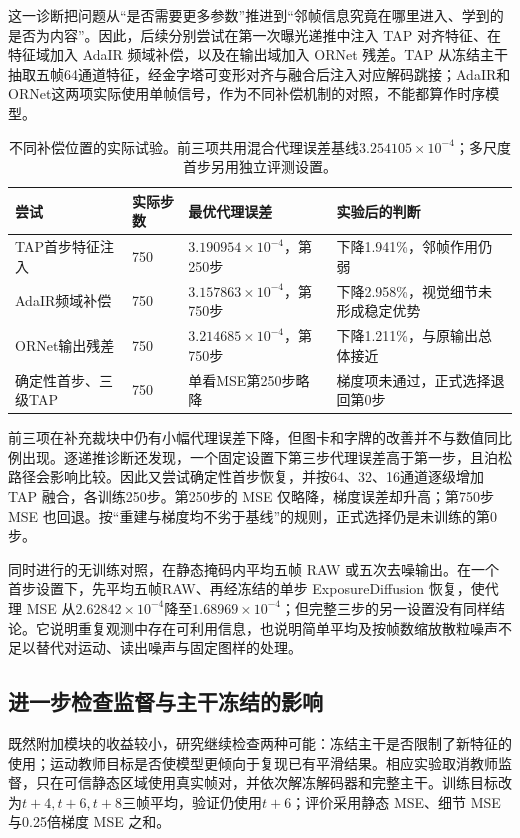 \documentclass[11pt,a4paper,UTF8,fontset=fandol]{ctexart}
\begin{document}
这一诊断把问题从“是否需要更多参数”推进到“邻帧信息究竟在哪里进入、学到的是否为内容”。因此，后续分别尝试在第一次曝光递推中注入 TAP 对齐特征、在特征域加入 AdaIR 频域补偿，以及在输出域加入 ORNet 残差。TAP 从冻结主干抽取五帧64通道特征，经金字塔可变形对齐与融合后注入对应解码跳接；AdaIR和ORNet这两项实际使用单帧信号，作为不同补偿机制的对照，不能都算作时序模型。

\begin{table}[!htbp]
\centering\small
\caption{不同补偿位置的实际试验。前三项共用混合代理误差基线$3.254105\times10^{-4}$；多尺度首步另用独立评测设置。}
\label{tab:djc_pilots}
\begin{tabular}{P{0.21\textwidth}P{0.12\textwidth}P{0.22\textwidth}P{0.33\textwidth}}
\toprule
尝试 & 实际步数 & 最优代理误差 & 实验后的判断 \\
\midrule
TAP首步特征注入 & 750 & $3.190954\times10^{-4}$，第250步 & 下降1.941\%，邻帧作用仍弱 \\
AdaIR频域补偿 & 750 & $3.157863\times10^{-4}$，第750步 & 下降2.958\%，视觉细节未形成稳定优势 \\
ORNet输出残差 & 750 & $3.214685\times10^{-4}$，第750步 & 下降1.211\%，与原输出总体接近 \\
确定性首步、三级TAP & 750 & 单看MSE第250步略降 & 梯度项未通过，正式选择退回第0步 \\
\bottomrule
\end{tabular}
\end{table}

前三项在补充裁块中仍有小幅代理误差下降，但图卡和字牌的改善并不与数值同比例出现。逐递推诊断还发现，一个固定设置下第三步代理误差高于第一步，且泊松路径会影响比较。因此又尝试确定性首步恢复，并按64、32、16通道逐级增加 TAP 融合，各训练250步。第250步的 MSE 仅略降，梯度误差却升高；第750步 MSE 也回退。按“重建与梯度均不劣于基线”的规则，正式选择仍是未训练的第0步。

同时进行的无训练对照，在静态掩码内平均五帧 RAW 或五次去噪输出。在一个首步设置下，先平均五帧RAW、再经冻结的单步 ExposureDiffusion 恢复，使代理 MSE 从$2.62842\times10^{-4}$降至$1.68969\times10^{-4}$；但完整三步的另一设置没有同样结论。它说明重复观测中存在可利用信息，也说明简单平均及按帧数缩放散粒噪声不足以替代对运动、读出噪声与固定图样的处理。

\subsection{进一步检查监督与主干冻结的影响}

既然附加模块的收益较小，研究继续检查两种可能：冻结主干是否限制了新特征的使用；运动教师目标是否使模型更倾向于复现已有平滑结果。相应实验取消教师监督，只在可信静态区域使用真实帧对，并依次解冻解码器和完整主干。训练目标改为$t+4,t+6,t+8$三帧平均，验证仍使用$t+6$；评价采用静态 MSE、细节 MSE 与0.25倍梯度 MSE 之和。
\end{document}
